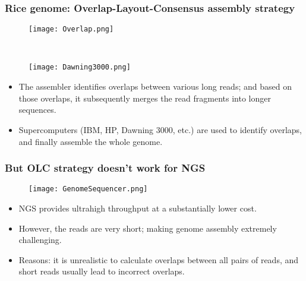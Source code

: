\documentclass[mathserif]{beamer}
\begin{document}
	
	\begin{frame}
		\frametitle{Rice genome: Overlap-Layout-Consensus assembly strategy} 
				
\begin{figure}%
   \begin{center}%
     \begin{minipage}{0.60\textwidth}%
      \texttt{[image: Overlap.png]}%
     \end{minipage}%
     \ 
     \begin{minipage}{0.20\textwidth}
      \texttt{[image: Dawning3000.png]}
     \end{minipage}%
   \end{center}
 \end{figure}
\begin{itemize}
	\item The assembler identifies overlaps between various long reads;  and based on those overlaps, it subsequently merges the read fragments into longer sequences.	
	\item Supercomputers (IBM, HP, Dawning 3000, etc.) are used to identify overlaps, and finally assemble the whole genome. 
	\end{itemize}



		
		
	\end{frame}
	
	

	\begin{frame}	
		\frametitle{But OLC strategy doesn't work for NGS}
 \begin{figure}
				\centering
				\texttt{[image: GenomeSequencer.png]}
			\end{figure}
			\begin{itemize}
			\item  NGS provides ultrahigh throughput at a substantially lower cost.
			\item However, the reads are very short; making genome assembly extremely challenging. 
			\item Reasons: it is unrealistic to calculate overlaps between all pairs of reads, and short reads usually lead to 
			incorrect overlaps. 
			\end{itemize}
	\end{frame}
\end{document}

